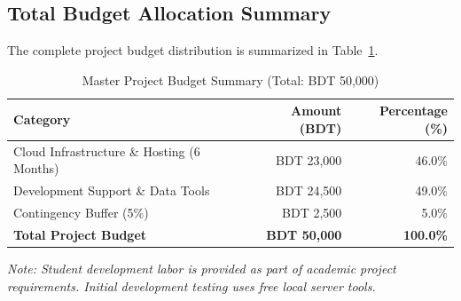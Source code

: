 \subsection{Total Budget Allocation Summary}

The complete project budget distribution is summarized in Table~\ref{tab:master-budget-50k}.

\begin{table}[h!]
\caption{Master Project Budget Summary (Total: BDT 50,000)}
\label{tab:master-budget-50k}
\vspace{6pt}
\centering
\begin{tabularx}{\textwidth}{|X|r|r|}
\hline
\textbf{Category} & \textbf{Amount (BDT)} & \textbf{Percentage (\%)} \\
\hline
Cloud Infrastructure \& Hosting (6 Months) & BDT 23,000 & 46.0\% \\
Development Support \& Data Tools & BDT 24,500 & 49.0\% \\
Contingency Buffer (5\%) & BDT 2,500 & 5.0\% \\
\hline
\textbf{Total Project Budget} & \textbf{BDT 50,000} & \textbf{100.0\%} \\
\hline
\end{tabularx}
\end{table}

\textit{Note: Student development labor is provided as part of academic project requirements. Initial development testing uses free local server tools.}